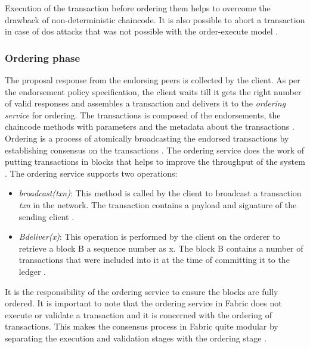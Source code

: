 \documentclass[
  a4paper,  %
  twoside,  %
  bibliography=totoc,
  headsepline,
  cleardoublepage=empty,
  parskip=half,
  draft=false
]{scrbook}
\begin{document}
Execution of the transaction before ordering them helps to overcome the drawback of non-deterministic chaincode. It is also possible to abort a transaction in case of \gls{dos} attacks that was not possible with the order-execute model \cite{HF}.

\subsubsection{Ordering phase}
The proposal response from the endorsing peers is collected by the client. As per the endorsement policy specification, the client waits till it gets the right number of valid responses and assembles a transaction and delivers it to the \textit{ordering service} for ordering. The transactions is composed of the endorsements, the chaincode methods with parameters and the metadata about the transactions \cite{HF}. Ordering is a process of atomically broadcasting \cite{ab} the endorsed transactions by establishing consensus on the transactions \cite{HF}. The ordering service does the work of putting transactions in blocks that helps to improve the throughput of the system \cite{HF}. The ordering service supports two operations:
\begin{itemize}
    \item \textit{broadcast(txn)}: This method is called by the client to broadcast a transaction \textit{txn} in the network. The transaction contains a payload and signature of the sending client \cite{HF}.
    \item  \textit{B\textleftarrow{}deliver(x)}: This operation is performed by the client on the orderer to retrieve a block B a sequence number as x. The block B contains a number of transactions that were included into it at the time of committing it to the ledger \cite{HF}.
\end{itemize}
It is the responsibility of the ordering service to ensure the blocks are fully ordered. It is important to note that the ordering service in Fabric does not execute or validate a transaction and it is concerned with the ordering of transactions. This makes the consensus process in Fabric quite modular by separating the execution and validation stages with the ordering stage \cite{HF}.
\end{document}
